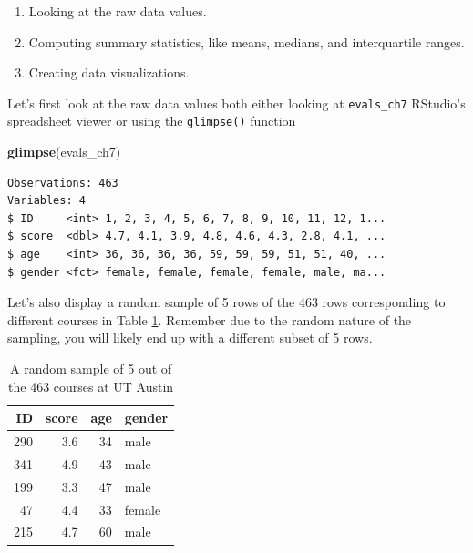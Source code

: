 \documentclass[12pt, krantz2,]{krantz}
\makeatletter
\newenvironment{Shaded}{\begin{snugshade}}{\end{snugshade}}
\newcommand{\DataTypeTok}[1]{\textcolor[rgb]{0.27,0.27,0.27}{#1}}
\newcommand{\DecValTok}[1]{\textcolor[rgb]{0.06,0.06,0.06}{#1}}
\newcommand{\KeywordTok}[1]{\textcolor[rgb]{0.27,0.27,0.27}{\textbf{#1}}}
\newcommand{\NormalTok}[1]{#1}
\newcommand{\OperatorTok}[1]{\textcolor[rgb]{0.43,0.43,0.43}{\textbf{#1}}}
\newcommand{\StringTok}[1]{\textcolor[rgb]{0.5,0.5,0.5}{#1}}
\providecommand{\tightlist}{%
  \setlength{\itemsep}{0pt}\setlength{\parskip}{0pt}}
\newenvironment{kframe}{%
\medskip{}
\setlength{\fboxsep}{.8em}
 \def\at@end@of@kframe{}%
 \ifinner\ifhmode%
  \def\at@end@of@kframe{\end{minipage}}%
  \begin{minipage}{\columnwidth}%
 \fi\fi%
 \def\FrameCommand##1{\hskip\@totalleftmargin \hskip-\fboxsep
 \colorbox{shadecolor}{##1}\hskip-\fboxsep
     \hskip-\linewidth \hskip-\@totalleftmargin \hskip\columnwidth}%
 \MakeFramed {\advance\hsize-\width
   \@totalleftmargin\z@ \linewidth\hsize
   \@setminipage}}%
 {\par\unskip\endMakeFramed%
 \at@end@of@kframe}
\renewenvironment{Shaded}{\begin{kframe}}{\end{kframe}}
\makeatother
\begin{document}
\begin{enumerate}
\def\labelenumi{\arabic{enumi}.}
\tightlist
\item
  Looking at the raw data values.
\item
  Computing summary statistics, like means, medians, and interquartile ranges.
\item
  Creating data visualizations.
\end{enumerate}

Let's first look at the raw data values both either looking at \texttt{evals\_ch7} RStudio's spreadsheet viewer or using the \texttt{glimpse()} function

\begin{Shaded}
\begin{Highlighting}[]
\KeywordTok{glimpse}\NormalTok{(evals_ch7)}
\end{Highlighting}
\end{Shaded}

\begin{verbatim}
Observations: 463
Variables: 4
$ ID     <int> 1, 2, 3, 4, 5, 6, 7, 8, 9, 10, 11, 12, 1...
$ score  <dbl> 4.7, 4.1, 3.9, 4.8, 4.6, 4.3, 2.8, 4.1, ...
$ age    <int> 36, 36, 36, 36, 59, 59, 59, 51, 51, 40, ...
$ gender <fct> female, female, female, female, male, ma...
\end{verbatim}

Let's also display a random sample of 5 rows of the 463 rows corresponding to different courses in Table \ref{tab:model4-data-preview}. Remember due to the random nature of the sampling, you will likely end up with a different subset of 5 rows.

\begin{Shaded}
\end{Shaded}

\begin{table}[H]

\caption{\label{tab:model4-data-preview}A random sample of 5 out of the 463 courses at UT Austin}
\centering
\fontsize{10}{12}\selectfont
\begin{tabular}{rrrl}
\toprule
ID & score & age & gender\\
\midrule
290 & 3.6 & 34 & male\\
341 & 4.9 & 43 & male\\
199 & 3.3 & 47 & male\\
47 & 4.4 & 33 & female\\
215 & 4.7 & 60 & male\\
\bottomrule
\end{tabular}
\end{table}
\end{document}
